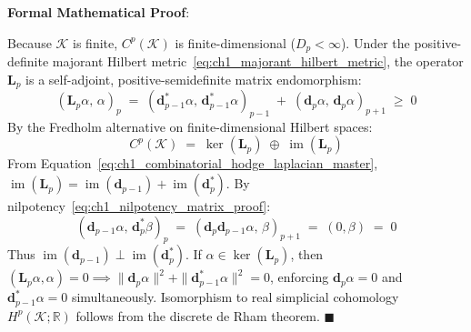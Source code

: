 \documentclass[
    12pt,
    a4paper,
    headings=normal,
    twoside=false,
    open=any,
    parskip=half
]{scrbook}
\newenvironment{myproof}[1][]{%
  \par\vspace{6pt}\noindent\textbf{\sffamily\color{maincolor}Formal Mathematical Proof\ifstrempty{#1}{}{ (#1)}}:\par\nopagebreak
}{%
  \penalty50\hfill\ensuremath{\blacksquare}\par\vspace{6pt}
}
\begin{document}
\begin{myproof}
Because $\mathcal{K}$ is finite, $C^p(\mathcal{K})$ is finite-dimensional ($D_p < \infty$). Under the positive-definite majorant Hilbert metric~\eqref{eq:ch1_majorant_hilbert_metric}, the operator $\mathbf{L}_p$ is a self-adjoint, positive-semidefinite matrix endomorphism:
\begin{equation*}
(\mathbf{L}_p \alpha, \, \alpha)_p \;=\; (\mathbf{d}_{p-1}^* \alpha, \, \mathbf{d}_{p-1}^* \alpha)_{p-1} \;+\; (\mathbf{d}_p \alpha, \, \mathbf{d}_p \alpha)_{p+1} \;\ge\; 0
\end{equation*}
By the Fredholm alternative on finite-dimensional Hilbert spaces:
\begin{equation*}
C^p(\mathcal{K}) \;=\; \ker(\mathbf{L}_p) \;\oplus\; \operatorname{im}(\mathbf{L}_p)
\end{equation*}
From Equation~\eqref{eq:ch1_combinatorial_hodge_laplacian_master}, $\operatorname{im}(\mathbf{L}_p) = \operatorname{im}(\mathbf{d}_{p-1}) + \operatorname{im}(\mathbf{d}_p^*)$. By nilpotency~\eqref{eq:ch1_nilpotency_matrix_proof}:
\begin{equation*}
(\mathbf{d}_{p-1} \alpha, \, \mathbf{d}_p^* \beta)_p \;=\; (\mathbf{d}_p \mathbf{d}_{p-1} \alpha, \, \beta)_{p+1} \;=\; (0, \beta) \;=\; 0
\end{equation*}
Thus $\operatorname{im}(\mathbf{d}_{p-1}) \perp \operatorname{im}(\mathbf{d}_p^*)$. If $\alpha \in \ker(\mathbf{L}_p)$, then $(\mathbf{L}_p \alpha, \alpha) = 0 \implies \|\mathbf{d}_p\alpha\|^2 + \|\mathbf{d}_{p-1}^*\alpha\|^2 = 0$, enforcing $\mathbf{d}_p \alpha = 0$ and $\mathbf{d}_{p-1}^* \alpha = 0$ simultaneously. Isomorphism to real simplicial cohomology $H^p(\mathcal{K}; \mathbb{R})$ follows from the discrete de Rham theorem.
\end{myproof}
\end{document}
